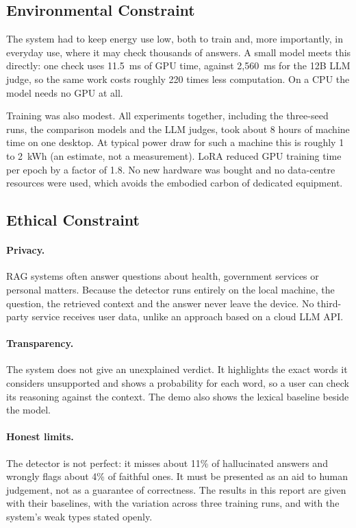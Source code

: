 \subsection{Environmental Constraint}

The system had to keep energy use low, both to train and, more importantly, in
everyday use, where it may check thousands of answers. A small model meets this
directly: one check uses 11.5~ms of GPU time, against 2,560~ms for the 12B LLM
judge, so the same work costs roughly 220 times less computation. On a CPU the
model needs no GPU at all.

Training was also modest. All experiments together, including the three-seed
runs, the comparison models and the LLM judges, took about 8 hours of machine
time on one desktop. At typical power draw for such a machine this is roughly
1 to 2~kWh (an estimate, not a measurement). LoRA reduced GPU training time per
epoch by a factor of 1.8. No new hardware was bought and no data-centre
resources were used, which avoids the embodied carbon of dedicated equipment.

\subsection{Ethical Constraint}

\paragraph{Privacy.} RAG systems often answer questions about health,
government services or personal matters. Because the detector runs entirely on
the local machine, the question, the retrieved context and the answer never
leave the device. No third-party service receives user data, unlike an
approach based on a cloud LLM API.

\paragraph{Transparency.} The system does not give an unexplained verdict. It
highlights the exact words it considers unsupported and shows a probability
for each word, so a user can check its reasoning against the context. The demo
also shows the lexical baseline beside the model.

\paragraph{Honest limits.} The detector is not perfect: it misses about 11\% of
hallucinated answers and wrongly flags about 4\% of faithful ones. It must be
presented as an aid to human judgement, not as a guarantee of correctness. The
results in this report are given with their baselines, with the variation
across three training runs, and with the system's weak types stated openly.

